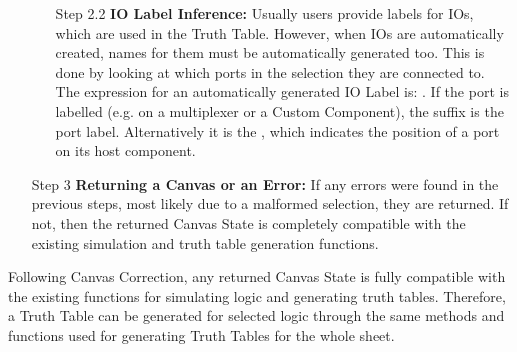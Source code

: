 \begin{itemize}
\begin{itemize}
        \item[Step 2.2] \textbf{IO Label Inference:} Usually users provide labels for IOs, which are used in the Truth Table. However, when IOs are automatically created, names for them must be automatically generated too. This is done by looking at which ports in the selection they are connected to. The expression for an automatically generated IO Label is: . If the port is labelled (e.g. on a multiplexer or a Custom Component), the suffix is the port label. Alternatively it is the , which indicates the position of a port on its host component.
        
    \end{itemize} 
    \item[Step 3] \textbf{Returning a Canvas or an Error:} If any errors were found in the previous steps, most likely due to a malformed selection, they are returned. If not, then the returned Canvas State is completely compatible with the existing simulation and truth table generation functions.
\end{itemize}

Following Canvas Correction, any returned Canvas State is fully compatible with the existing functions for simulating logic and generating truth tables. Therefore, a Truth Table can be generated for selected logic through the same methods and functions used for generating Truth Tables for the whole sheet.

